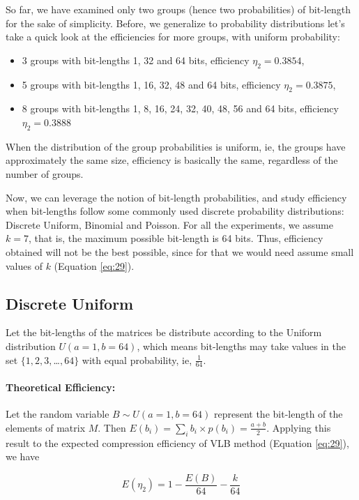 \documentclass[10pt]{article}
\begin{document}
So far, we have examined only two groups (hence two probabilities) of bit-length 
for the sake of simplicity. Before, we generalize to probability distributions 
let's take a quick look at the efficiencies for more groups, with uniform 
probability:

\begin{itemize}
  \item 3 groups with bit-lengths 1, 32 and 64 bits, efficiency $\eta_2=0.3854$,
  \item 5 groups with bit-lengths 1, 16, 32, 48 and 64 bits, efficiency $\eta_2=0.3875$,
  \item 8 groups with bit-lengths 1, 8, 16, 24, 32, 40, 48, 56 and 64 bits, efficiency $\eta_2=0.3888$
\end{itemize}

When the distribution of the group probabilities is uniform, ie, the groups 
have approximately the same size, efficiency is basically the same, regardless 
of the number of groups.

Now, we can leverage the notion of bit-length probabilities, and study 
efficiency when bit-lengths follow some commonly used discrete probability 
distributions: Discrete Uniform, Binomial and Poisson. For all the experiments, 
we assume $k=7$, that is, the maximum possible bit-length is 64 bits. Thus, 
efficiency obtained will not be the best possible, since for that we would need 
assume small values of $k$ (Equation \ref{eq:29}). 

\subsection*{Discrete Uniform}
Let the bit-lengths of the matrices be distribute according to the Uniform 
distribution $U(a=1,b=64)$, which means bit-lengths may take values in the set 
$\{1, 2, 3, $\ldots$, 64\}$ with equal probability, ie, $\frac{1}{64}$. 

\paragraph{Theoretical Efficiency:}
Let the random variable $B \sim U(a=1,b=64)$ represent the  bit-length of the 
elements of matrix $M$. Then $E(b_i) = \sum_{i} b_i \times p(b_i) = 
\frac{a+b}{2}$.  Applying this result to the expected compression efficiency of 
VLB method (Equation \ref{eq:29}), we have

\begin{equation}\label{eq:44}
 E(\eta_2) = 1 - \frac{E(B)}{64} - \frac{k}{64} 
\end{equation}
\end{document}
